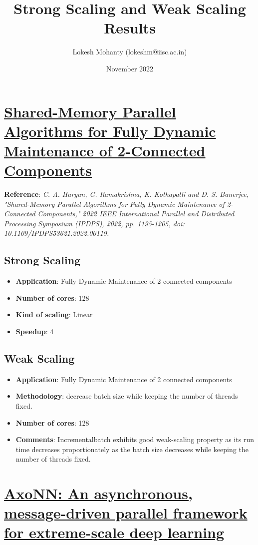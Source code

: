 \documentclass[11pt]{article}
\author{Lokesh Mohanty (lokeshm@iisc.ac.in)}
\date{November 2022}
\title{Strong Scaling and Weak Scaling Results}
\begin{document}
\maketitle

\section{\href{https://ieeexplore.ieee.org/document/9820712}{Shared-Memory Parallel Algorithms for Fully Dynamic Maintenance of 2-Connected Components}}
\label{sec:org7df2844}

\textbf{Reference}: \textit{C. A. Haryan, G. Ramakrishna, K. Kothapalli and D. S. Banerjee, "Shared-Memory Parallel Algorithms for Fully Dynamic Maintenance of 2-Connected Components," 2022 IEEE International Parallel and Distributed Processing Symposium (IPDPS), 2022, pp. 1195-1205, doi: 10.1109/IPDPS53621.2022.00119.}

\subsection*{Strong Scaling}
\label{sec:org3f355b6}
\begin{itemize}
\item \textbf{Application}: Fully Dynamic Maintenance of 2 connected components 
\item \textbf{Number of cores}: 128
\item \textbf{Kind of scaling}: Linear
\item \textbf{Speedup}: 4
\end{itemize}

\subsection*{Weak Scaling}
\label{sec:org021e417}
\begin{itemize}
\item \textbf{Application}: Fully Dynamic Maintenance of 2 connected components 
\item \textbf{Methodology}: decrease batch size while keeping the number of threads fixed.
\item \textbf{Number of cores}: 128
\item \textbf{Comments}:
Incrementalbatch exhibits good weak-scaling property as its run time decreases proportionately as the batch size decreases while keeping the number of threads fixed.
\end{itemize}

\pagebreak
\section{\href{https://ieeexplore.ieee.org/document/9820664}{AxoNN: An asynchronous, message-driven parallel framework for extreme-scale deep learning}}
\label{sec:org9189eba}
\end{document}
